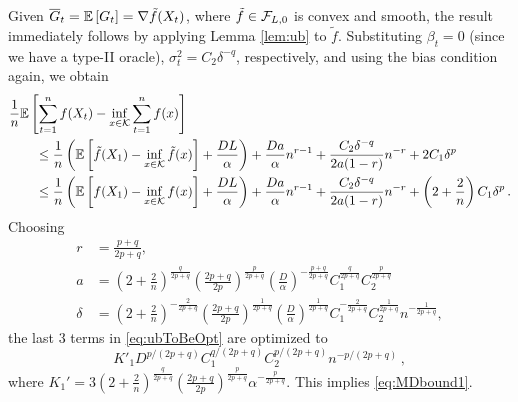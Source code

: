 Given $\overline{G}_t=\mathbb{E}\left[G_t\right] = \nabla \tilde{f}(X_t)$, where $\tilde{f}\in \mathcal{F}_{L,0}$ is convex and smooth,
the result immediately follows by applying Lemma \ref{lem:ub} to $\tilde{f}$.
Substituting
 $\beta_t = 0$ (since we have a type-II oracle), $\sigma^2_t = C_2 \delta^{-q}$, respectively, and using the bias condition again, we obtain
 \begin{align}
\MoveEqLeft
\frac{1}{n} \EE{ \sum_{t=1}^n f( X_t) - \inf_{x \in \cK} \sum_{t=1}^n f(x)} \nonumber \\
&\le \frac{1}{n}\left(\EE{\tilde{f}(X_1)-\inf_{x \in \cK}\tilde{f}(x)}+\frac{DL}{\alpha}  \right) %
+\frac{Da}{\alpha} n^{r-1}+\dfrac{C_2 \delta^{-q}}{2a(1-r)}n^{-r}+ 2 C_1\delta^p \\
&\le \frac{1}{n}\left(\EE{f(X_1)-\inf_{x \in \cK}f(x)}+\frac{DL}{\alpha}  \right) %
+\frac{Da}{\alpha} n^{r-1}+\dfrac{C_2 \delta^{-q}}{2a(1-r)}n^{-r}+ \left(2+\dfrac{2}{n}\right)C_1\delta^p \,.
\label{eq:ubToBeOpt}
 \end{align}
 Choosing 
 \begin{align*} 
 r &= \tfrac{p+q}{2p+q}, \\  
a&= \left(2+\tfrac{2}{n}\right)^{\frac{q}{2p+q}}\left(\tfrac{2p+q}{2p}\right)^{\frac{p}{2p+q}} \left(\tfrac{D}{\alpha}\right)^{-\frac{p+q}{2p+q}}  C_1^{\frac{q}{2p+q}} C_2^{\frac{p}{2p+q}} \\
 \delta &=  \left(2+\tfrac{2}{n}\right)^{-\frac{2}{2p+q}}\left(\tfrac{2p+q}{2p}\right)^{\frac{1}{2p+q}} \left(\tfrac{D}{\alpha}\right)^{\frac{1}{2p+q}}  C_1^{-\frac{2}{2p+q}} C_2^{\frac{1}{2p+q}} n^{-\frac{1}{2p+q}}, 
 \end{align*}
the last $3$ terms in \eqref{eq:ubToBeOpt} are optimized to
 \[
 K'_1 D^{p/(2p+q)} C_1^{q/(2p+q)} C_2^{p/(2p+q)} n ^{-p/(2p+q)} \,,
 \]
where $K_1'= 3\left(2+\frac{2}{n}\right)^{\frac{q}{2p+q}}\left(\frac{2p+q}{2p}\right)^{\frac{p}{2p+q}}  \alpha^{-\frac{p}{2p+q}}$.
 This implies \eqref{eq:MDbound1}.
 
